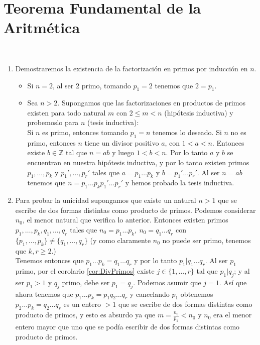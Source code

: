\documentclass{report}
\begin{document}
\newpage\section{Teorema Fundamental de la Aritmética}
\begin{myproof} \ \\
	\begin{enumerate}
		\item Demostraremos la existencia de la factorización en primos por inducción en $n$.
		      \begin{itemize}
			      \item Si $n=2$, al ser 2 primo, tomando $p_1=2$ tenemos que $2=p_1$.
			      \item Sea $n>2$. Supongamos que las factorizaciones en productos de primos existen para todo natural $m$ con $2\le m<n$ (hipótesis inductiva) y probemoslo para $n$ (tesis inductiva):\\
			            Si $n$ es primo, entonces tomando $p_1=n$ tenemos lo deseado. Si $n$ no es primo, entonces $n$ tiene un divisor positivo $a$, con $1<a<n$. Entonces existe $b\in\mathbb{Z}$ tal que $n=ab$ y luego $1<b<n$. Por lo tanto $a$ y $b$ se encuentran en nuestra hipótesis inductiva, y por lo tanto existen primos $p_1,\dots,p_k$ y $p_1',\dots,p_r'$ tales que $a=p_1\dots p_k$ y $b=p_1'\dots p_r'$. Al ser $n=ab$ tenemos que $n=p_1\dots p_kp_1'\dots p_r'$ y hemos probado la tesis inductiva.
		      \end{itemize}
		\item Para probar la unicidad supongamos que existe un natural $n>1$ que se escribe de dos formas distintas como producto de primos. Podemos considerar $n_0$, el menor natural que verifica lo anterior. Entonces existen primos $p_1,\dots,p_k,q_1,\dots,q_r$ tales que $n_0=p_1\dots p_k,\ n_0=q_1\dots q_r$ con $\{p_1,\dots,p_k\}\neq\{q_1,\dots,q_r\}$ (y como claramente $n_0$ no puede ser primo, tenemos que $k,r\ge2$.)\\
		      Tenemos entonces que $p_1\dots p_k=q_1\dots q_r$ y por lo tanto $p_1|q_1\dots q_r$. Al ser $p_1$ primo, por el corolario \ref{cor:DivPrimos} existe $j\in\{1,\dots,r\}$ tal que $p_1|q_j$; y al ser $p_1>1$ y $q_j$ primo, debe ser $p_1=q_j$. Podemos asumir que $j=1$. Así que ahora tenemos que $p_1\dots p_k=p_1q_2\dots q_r$ y cancelando $p_1$ obtenemos $p_2\dots p_k=q_2\dots q_r$ es un entero $>1$ que se escribe de dos formas distintas como producto de primos, y esto es absurdo ya que $m=\frac{n_0}{p_1}<n_0$ y $n_0$ era el menor entero mayor que uno que se podía escribir de dos formas distintas como producto de primos.
	\end{enumerate}
\end{myproof}
\end{document}
